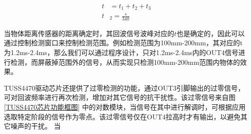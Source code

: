         \begin{align}
            t&=t_1+t_2+t_3 \\
            t&_2=\frac{s}{340}
        \label{检测周期公式}
        \end{align}
            

   
    当物体距离传感器的距离确定时，其回波信号波峰对应的$t$也是确定的，因此可以通过控制检测窗口来控制检测范围。例如检测范围为100mm-200mm，其对应的t为1.2ms-2.4ms，那么我们可以通过程序设计，只对1.2ms-2.4ms内的OUT4信号进行检测，而屏蔽掉范围外的信号，从而实现只检测100mm-200mm范围内物体的效果。\par
    TUSS4470驱动芯片还提供了过零检测的功能，通过OUT3引脚输出的过零信号，可对回波频率进行再次检测，增加对其它信号的抗干扰性。该过零信号来自图\ref{TUSS4470芯片功能框图}
    中的对数模块，当信号在其中进行解调时，可根据应用选取特定阶段的信号作为零点。该过零信号仅在OUT4拉高时才有输出，以避免其它噪声的干扰。
    当
